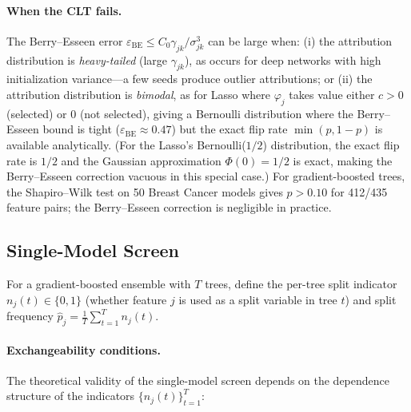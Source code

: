 \documentclass{article}
\begin{document}
\paragraph{When the CLT fails.}
The Berry--Esseen error $\varepsilon_{\text{BE}} \leq C_0 \gamma_{jk}/\sigma_{jk}^3$ can be large when: (i) the attribution distribution is \emph{heavy-tailed} (large $\gamma_{jk}$), as occurs for deep networks with high initialization variance---a few seeds produce outlier attributions; or (ii) the attribution distribution is \emph{bimodal}, as for Lasso where $\varphi_j$ takes value either $c > 0$ (selected) or $0$ (not selected), giving a Bernoulli distribution where the Berry--Esseen bound is tight ($\varepsilon_{\text{BE}} \approx 0.47$) but the exact flip rate $\min(p, 1-p)$ is available analytically. (For the Lasso's Bernoulli($1/2$) distribution, the exact flip rate is $1/2$ and the Gaussian approximation $\Phi(0) = 1/2$ is exact, making the Berry--Esseen correction vacuous in this special case.) For gradient-boosted trees, the Shapiro--Wilk test on 50 Breast Cancer models gives $p > 0.10$ for 412/435 feature pairs; the Berry--Esseen correction is negligible in practice.

\subsection{Single-Model Screen}
\label{sec:f5}

\begin{sloppypar}
For a gradient-boosted ensemble with $T$ trees, define the per-tree split indicator
$n_j(t) \in \{0,1\}$ (whether feature $j$ is used as a split variable in tree $t$)
and split frequency $\hat{p}_j = \frac{1}{T}\sum_{t=1}^T n_j(t)$.
\end{sloppypar}

\paragraph{Exchangeability conditions.}
The theoretical validity of the single-model screen depends on the dependence structure of the indicators $\{n_j(t)\}_{t=1}^T$:
\end{document}

